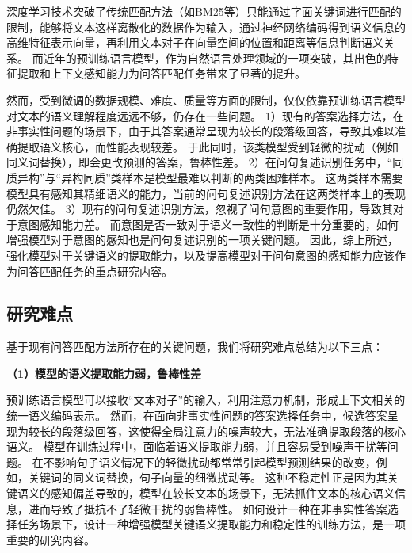 
深度学习技术突破了传统匹配方法（如BM25等）只能通过字面关键词进行匹配的限制，能够将文本这样离散化的数据作为输入，通过神经网络编码得到语义信息的高维特征表示向量，再利用文本对子在向量空间的位置和距离等信息判断语义关系。
而近年的预训练语言模型，作为自然语言处理领域的一项突破，其出色的特征提取和上下文感知能力为问答匹配任务带来了显著的提升。

然而，受到微调的数据规模、难度、质量等方面的限制，仅仅依靠预训练语言模型对文本的语义理解程度远远不够，仍存在一些问题。
1）现有的答案选择方法，在非事实性问题的场景下，由于其答案通常呈现为较长的段落级回答，导致其难以准确提取语义核心，而性能表现较差。
于此同时，该类模型受到轻微的扰动（例如同义词替换），即会更改预测的答案，鲁棒性差。
2）在问句复述识别任务中，“同质异构”与“异构同质”类样本是模型最难以判断的两类困难样本。
这两类样本需要模型具有感知其精细语义的能力，当前的问句复述识别方法在这两类样本上的表现仍然欠佳。
3）现有的问句复述识别方法，忽视了问句意图的重要作用，导致其对于意图感知能力差。
而意图是否一致对于语义一致性的判断是十分重要的，如何增强模型对于意图的感知也是问句复述识别的一项关键问题。
因此，综上所述，强化模型对于关键语义的提取能力，以及提高模型对于问句意图的感知能力应该作为问答匹配任务的重点研究内容。


\subsection{研究难点}

基于现有问答匹配方法所存在的关键问题，我们将研究难点总结为以下三点：

\textbf{\songti （1）模型的语义提取能力弱，鲁棒性差}

预训练语言模型可以接收“文本对子”的输入，利用注意力机制，形成上下文相关的统一语义编码表示。
然而，在面向非事实性问题的答案选择任务中，候选答案呈现为较长的段落级回答，这使得全局注意力的噪声较大，无法准确提取段落的核心语义。
模型在训练过程中，面临着语义提取能力弱，并且容易受到噪声干扰等问题。
在不影响句子语义情况下的轻微扰动都常常引起模型预测结果的改变，例如，关键词的同义词替换，句子向量的细微扰动等。
这种不稳定性正是因为其关键语义的感知偏差导致的，模型在较长文本的场景下，无法抓住文本的核心语义信息，进而导致了抵抗不了轻微干扰的弱鲁棒性。
如何设计一种在非事实性答案选择任务场景下，设计一种增强模型关键语义提取能力和稳定性的训练方法，是一项重要的研究内容。


